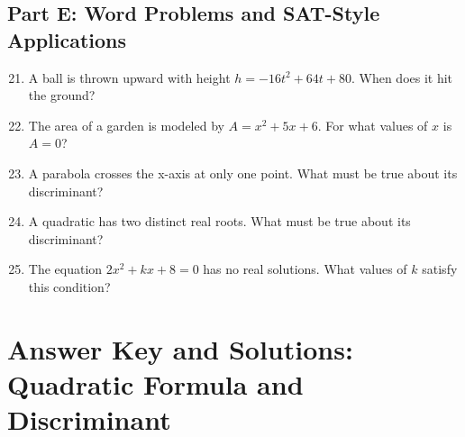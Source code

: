 \documentclass[12pt]{article}
\begin{document}
\subsection*{Part E: Word Problems and SAT-Style Applications}
\begin{enumerate}
  \setcounter{enumi}{20}
  \item A ball is thrown upward with height \(h = -16t^2 + 64t + 80.\) When does it hit the ground?
  \item The area of a garden is modeled by \(A = x^2 + 5x + 6.\) For what values of \(x\) is \(A = 0\)?
  \item A parabola crosses the x-axis at only one point. What must be true about its discriminant?
  \item A quadratic has two distinct real roots. What must be true about its discriminant?
  \item The equation \(2x^2 + kx + 8 = 0\) has no real solutions. What values of \(k\) satisfy this condition?
\end{enumerate}

\newpage


\section*{Answer Key and Solutions: Quadratic Formula and Discriminant}
\end{document}
